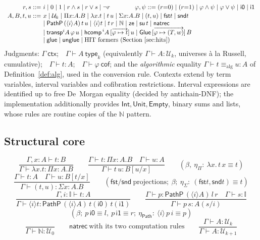 \documentclass{lmcs}
\newcommand{\I}{\mathbb{I}}
\newcommand{\transp}{\mathsf{transp}}
\newcommand{\hcomp}{\mathsf{hcomp}}
\newcommand{\Glue}{\mathsf{Glue}}
\newcommand{\glue}{\mathsf{glue}}
\newcommand{\unglue}{\mathsf{unglue}}
\renewcommand{\conv}{\equiv}
\newcommand{\aconv}{\equiv_{\mathrm{alg}}}
\newcommand{\Path}{\mathsf{Path}}
\providecommand{\fst}{}\renewcommand{\fst}{\mathsf{fst}}
\providecommand{\snd}{}\renewcommand{\snd}{\mathsf{snd}}
\newcommand{\U}{\mathcal{U}}
\newcommand{\ii}{\mathsf{i1}}
\newcommand{\io}{\mathsf{i0}}
\begin{document}
\[
\begin{array}{r@{\ }l}
  r, s ::=& i \mid 0 \mid 1 \mid r \wedge s \mid r \vee s \mid \neg r
  \qquad\qquad
  \varphi, \psi ::= (r{=}0) \mid (r{=}1) \mid \varphi \wedge \psi
    \mid \varphi \vee \psi \mid \io \mid \ii \\[2pt]
  A, B, t, u ::=& x \mid \U_k
    \mid \Pi x{:}A.B \mid \lambda x.t \mid t\,u
    \mid \Sigma x{:}A.B \mid (t, u) \mid \fst t \mid \snd t \\
  &\mid \mathsf{PathP}\,(\langle i \rangle A)\,t\,u
    \mid \langle i \rangle t \mid t\,r
    \mid \mathbb{N} \mid \mathsf{ze} \mid \mathsf{su}\,t
    \mid \mathsf{natrec} \\
  &\mid \transp^i A\,\varphi\,u
    \mid \hcomp^{\,i} A\,[\overrightarrow{\varphi \mapsto t}]\,u
    \mid \Glue\,[\overrightarrow{\varphi \mapsto (T, w)}]\,B \\
  &\mid \glue \mid \unglue
    \mid \text{HIT formers (Section~\ref{sec:hits})}
\end{array}
\]
Judgments: $\Gamma\ \mathsf{ctx}$;\ \ $\Gamma \vdash A\ \mathsf{type}_k$
(equivalently $\Gamma \vdash A : \U_k$, universes \`a la Russell,
cumulative);\ \ $\Gamma \vdash t : A$;\ \ $\Gamma \vdash
\varphi\ \mathsf{cof}$; and the \emph{algorithmic} equality
$\Gamma \vdash t \aconv u : A$ of Definition~\ref{def:alg}, used in
the conversion rule.  Contexts extend by term variables, interval
variables and cofibration restrictions.  Interval expressions are
identified up to free De~Morgan equality (decided by antichain-DNF);
the implementation additionally provides
$\mathsf{Int}, \mathsf{Unit}, \mathsf{Empty}$, binary sums and lists,
whose rules are routine copies of the $\mathbb{N}$ pattern.

\subsection{Structural core}

\[
  \frac{\Gamma, x{:}A \vdash t : B}
       {\Gamma \vdash \lambda x.t : \Pi x{:}A.B}
  \qquad
  \frac{\Gamma \vdash t : \Pi x{:}A.B \quad \Gamma \vdash u : A}
       {\Gamma \vdash t\,u : B[u/x]}
  \qquad
  (\beta,\ \eta_\Pi:\ \lambda x.\,t\,x \conv t)
\]
\[
  \frac{\Gamma \vdash t : A \quad \Gamma \vdash u : B[t/x]}
       {\Gamma \vdash (t,u) : \Sigma x{:}A.B}
  \qquad
  (\fst/\snd\ \text{projections};\ \beta;\
   \eta_\Sigma:\ (\fst t, \snd t) \conv t)
\]
\[
  \frac{\Gamma, i{:}\I \vdash t : A}
       {\Gamma \vdash \langle i \rangle t :
         \mathsf{PathP}\,(\langle i \rangle A)\,t(\io)\,t(\ii)}
  \qquad
  \frac{\Gamma \vdash p : \mathsf{PathP}\,(\langle i \rangle A)\,l\,r
        \quad \Gamma \vdash s : \I}
       {\Gamma \vdash p\,s : A(s/i)}
\]
\[
  (\beta;\ p\,\io \conv l,\ p\,\ii \conv r;\
   \eta_{\Path}:\ \langle i \rangle\, p\,i \conv p)
\]
\[
  \frac{}{\Gamma \vdash \mathbb{N} : \U_0}
  \qquad
  \mathsf{natrec}\ \text{with its two computation rules}
  \qquad
  \frac{\Gamma \vdash A : \U_k}{\Gamma \vdash A : \U_{k+1}}
\]
\end{document}
